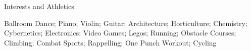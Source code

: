 \documentclass{resume} %
\begin{document}
\fi
\begin{rSection}{Interests and Athletics} \itemsep -3pt
\item Ballroom Dance; Piano; Violin; Guitar; Architecture; Horticulture; Chemistry; Cybernetics; Electronics; Video Games; Legos; Running; Obstacle Courses; Climbing; Combat Sports; Rappelling; One Punch Workout; Cycling

\end{rSection}
\fi
{}%
\end{document}
